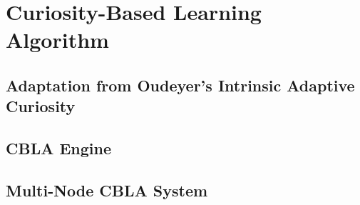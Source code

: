 \chapter{Curiosity-Based Learning Algorithm}
\section{Adaptation from Oudeyer’s Intrinsic Adaptive Curiosity}

\section{CBLA Engine}

\section{Multi-Node CBLA System}

